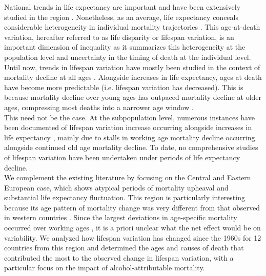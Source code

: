 \documentclass{article}
\begin{document}
\begin{spacing}{1.5}
National trends in life expectancy are important and have been extensively studied in the region \citep{mesle2004mortality, mesle2000, rychtarikova2004case,shkolnikov2001,shkolnikov2006changing,leon2011}. Nonetheless, as an average, life expectancy conceals considerable heterogeneity in individual mortality trajectories \citep{edwards2005, wilmoth1999}. This age-at-death variation, hereafter referred to as life disparity or lifespan variation, is an important dimension of inequality as it summarizes \textcolor[rgb]{1,0,0}{this heterogeneity at the population level and uncertainty in the timing of death at the individual level}. Until now, trends in lifespan variation have mostly been studied in the context of mortality decline at all ages \citep{edwards2005,smits2009,vaupel2011}. Alongside increases in life expectancy, ages at death have become more predictable (i.e. lifespan variation has decreased). This is because mortality decline over young ages has outpaced mortality decline at older ages, compressing most deaths into a narrower age window \citep{vaupel2011}.\\

This need not be the case. At the subpopulation level, numerous instances have been documented of lifespan variation increase occurring alongside increases in life expectancy \citep{vanraalte2014,sasson2016trends,seaman2016increasing, bronnum-hansen2017}, mainly due to stalls in working age mortality decline occurring alongside continued old age mortality decline. To date, no comprehensive studies of lifespan variation have been undertaken under periods of life expectancy decline.\\

We complement the existing literature by focusing on the Central and Eastern European case, which shows atypical periods of mortality upheaval and substantial life expectancy fluctuation. This region is particularly interesting because its age pattern of mortality change was very different from that observed in western countries \citep{mesle2004mortality}. Since the \textcolor[rgb]{1,0,0}{largest deviations} in age-specific mortality occurred over working ages \citep{rehm2007}, it is a priori unclear what the net effect would be on variability. We analyzed how lifespan variation has changed since the 1960s for 12 countries from this region and determined the ages and causes of death that contributed the most to the observed change in lifespan variation, with a particular focus on the impact of alcohol-attributable mortality. 
%



\end{spacing}
\end{document}
